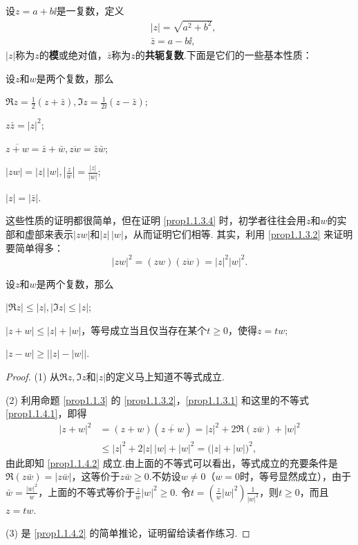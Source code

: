 设$z=a+b\ii$是一复数，定义
\begin{align*}
  & |z| = \sqrt{a^2+b^2},\\
  & \bar z = a-b\ii,
\end{align*}
$|z|$称为$z$的\textbf{模}或绝对值，$\bar z$称为$z$的\textbf{共轭复数}.下面是它们的一些基本性质：
\begin{prop}\label{prop1.1.3}
  设$z$和$w$是两个复数，那么
  \begin{eenum}
    \item $\Re z=\frac12(z+\bar z),\Im z=\frac1{2\ii}(z-\bar z)$;\label{prop1.1.3.1}
    \item $z\bar z=|z|^2$;\label{prop1.1.3.2}
    \item $\overline{z+w}=\bar z+\bar w,\overline{zw}=\bar z\bar w$;\label{prop1.1.3.3}
    \item $|zw|=|z|\,|w|,\left|\frac zw\right|=\frac{|z|}{|w|}$;\label{prop1.1.3.4}
    \item $|z|=|\bar z|$.\label{prop1.1.3.5}
  \end{eenum}
\end{prop}

这些性质的证明都很简单，但在证明 \ref{prop1.1.3.4} 时，初学者往往会用$z$和$w$的实部和虚部来表示$|zw|$和$|z|\,|w|$，从而证明它们相等. 其实，利用 \ref{prop1.1.3.2} 来证明要简单得多：
\[
  |zw|^2 = (zw)(\overline{zw}) = |z|^2|w|^2.
\]

\begin{prop}\label{prop1.1.4}
  设$z$和$w$是两个复数，那么
  \begin{eenum}
    \item $|\Re z|\le |z|,|\Im z|\le |z|$;\label{prop1.1.4.1}
    \item $|z+w|\le|z|+|w|$，等号成立当且仅当存在某个$t\ge0$，使得$z=tw$;\label{prop1.1.4.2}
    \item $|z-w|\ge\bigl||z|-|w|\bigr|$.\label{prop1.1.4.3}
  \end{eenum}
\end{prop}
\begin{proof}
(1) 从$\Re z,\Im z$和$|z|$的定义马上知道不等式成立.

(2) 利用命题 \ref{prop1.1.3} 的 \ref{prop1.1.3.2}，\ref{prop1.1.3.1} 和这里的不等式 \ref{prop1.1.4.1}，即得
\begin{align*}
  |z+w|^2 & = (z+w)(\overline{z + w}) = |z|^2+2\Re(z\bar w) + |w|^2\\
  &\le|z|^2 + 2|z|\,|w| + |w|^2 = \big(|z| + |w|\big)^2,
\end{align*}
由此即知 \ref{prop1.1.4.2} 成立.由上面的不等式可以看出，等式成立的充要条件是$\Re(z\bar w)=|z\bar w|$，这等价于$z\bar w\ge0$.不妨设$w\ne0$（$w=0$时，等号显然成立），由于$\bar w=\frac{|w|^2}{w}$，上面的不等式等价于$\frac zw|w|^2\ge0$. 令$t=\left(\frac zw|w|^2\right)\frac1{|w|^2}$，则$t\ge0$，而且$z=tw$.

(3) 是 \ref{prop1.1.4.2} 的简单推论，证明留给读者作练习.
\end{proof}

